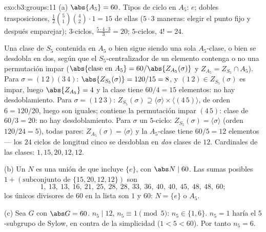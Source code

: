 \begin{solution}{exo:b3:groups:11}
(a) $\abs{A_5} = 60$. Tipos de ciclo en $A_5$: $e$; dobles
trasposiciones, $\frac{1}{2}\binom{5}{1}\binom{4}{2}\cdot 1 = 15$ de
ellas ($5 \cdot 3$ maneras: elegir el punto fijo y después emparejar);
$3$-ciclos, $\frac{5 \cdot 4 \cdot 3}{3} = 20$; $5$-ciclos, $4! =
24$.

Una clase de $S_5$ contenida en $A_5$ o bien sigue siendo una sola
$A_5$-clase, o bien se desdobla en dos, según que el $S_5$-centralizador
de un elemento contenga o no una permutación impar
($\abs{\text{clase en }A_5} =
60/\abs{Z_{A_5}(\sigma)}$ y $Z_{A_5} = Z_{S_5} \cap A_5$). Para
$\sigma = (1\,2)(3\,4)$: $\abs{Z_{S_5}(\sigma)} = 120/15 = 8$, y
$(1\,2) \in Z_{S_5}(\sigma)$ es impar, luego $\abs{Z_{A_5}} = 4$ y la
clase tiene $60/4 = 15$ elementos: no hay desdoblamiento. Para $\sigma =
(1\,2\,3)$: $Z_{S_5}(\sigma) \supseteq \langle \sigma \rangle
\times \langle (4\,5)\rangle$, de orden $6 = 120/20$, luego son iguales;
contiene la permutación impar $(4\,5)$: clase de $60/3 = 20$: no hay
desdoblamiento. Para $\sigma$ un $5$-ciclo:
$Z_{S_5}(\sigma) = \langle \sigma\rangle$ (orden $120/24 = 5$), todas
pares: $Z_{A_5}(\sigma) = \langle
\sigma\rangle$ y la $A_5$-clase tiene $60/5 = 12$ elementos --- los $24$
ciclos de longitud cinco se desdoblan en \emph{dos} clases de $12$.
Cardinales de las clases: $1, 15, 20, 12, 12$.

(b) Un  $N$ es una unión
de  que incluye
$\{e\}$, con $\abs N \mid 60$. Las sumas posibles $1 +
(\text{subconjunto de } \{15, 20, 12, 12\})$ son
\[
1,\ 13,\ 13,\ 16,\ 21,\ 25,\ 28,\ 28,\ 33,\ 36,\ 40,\ 40,\ 45,\
48,\ 48,\ 60 ;
\]
los únicos divisores de $60$ en la lista son $1$ y $60$: $N =
\{e\}$ o $A_5$.

(c) Sea $G$  con $\abs G = 60$.
$n_5 \mid 12$, $n_5
\equiv 1 \pmod 5$: $n_5 \in \{1, 6\}$. $n_5 = 1$ haría
 el $5$-subgrupo de Sylow, en
contra de la simplicidad ($1 < 5 <
60$). Por tanto $n_5 = 6$.
\end{solution}

